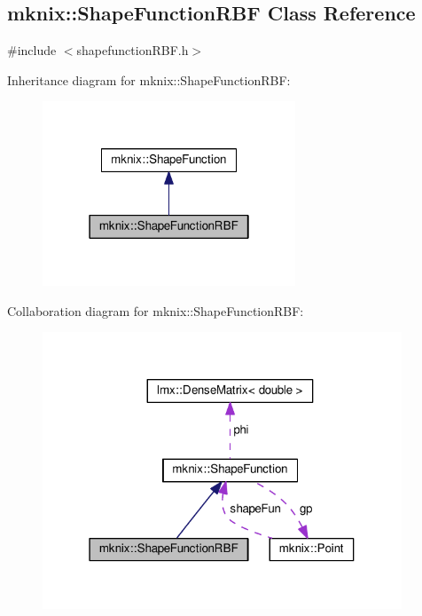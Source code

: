 \hypertarget{classmknix_1_1_shape_function_r_b_f}{}\subsection{mknix\+:\+:Shape\+Function\+R\+B\+F Class Reference}
\label{classmknix_1_1_shape_function_r_b_f}


{\ttfamily \#include $<$shapefunction\+R\+B\+F.\+h$>$}



Inheritance diagram for mknix\+:\+:Shape\+Function\+R\+B\+F\+:\nopagebreak
\begin{figure}[H]
\begin{center}
\leavevmode
\includegraphics[width=214pt]{de/d7f/classmknix_1_1_shape_function_r_b_f__inherit__graph}
\end{center}
\end{figure}


Collaboration diagram for mknix\+:\+:Shape\+Function\+R\+B\+F\+:\nopagebreak
\begin{figure}[H]
\begin{center}
\leavevmode
\includegraphics[width=304pt]{de/d76/classmknix_1_1_shape_function_r_b_f__coll__graph}
\end{center}
\end{figure}
